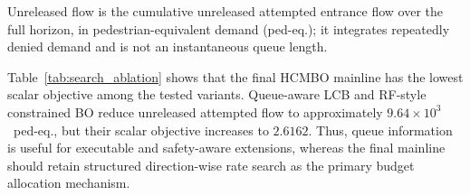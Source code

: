 \documentclass[lettersize,journal]{IEEEtran}
\begin{document}
\begin{table}[!t]
\centering
\caption{Search-Mechanism Ablation Under Seed 23}
\label{tab:search_ablation}
\footnotesize
\setlength{\tabcolsep}{1pt}
\par\vspace{3.5mm}
\noindent\parbox{\columnwidth}{\footnotesize Unreleased flow is the cumulative unreleased attempted entrance flow over the full horizon, in pedestrian-equivalent demand (ped-eq.); it integrates repeatedly denied demand and is not an instantaneous queue length.}
\end{table}

Table~\ref{tab:search_ablation} shows that the final HCMBO mainline has the lowest scalar objective among the tested variants.
Queue-aware LCB and RF-style constrained BO reduce unreleased attempted flow to approximately $9.64\times10^3$~ped-eq., but their scalar objective increases to $2.6162$.
Thus, queue information is useful for executable and safety-aware extensions, whereas the final mainline should retain structured direction-wise rate search as the primary budget allocation mechanism.
\end{document}
